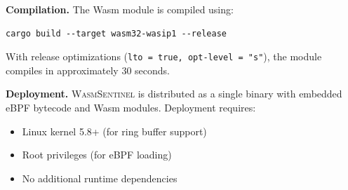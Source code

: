 \textbf{Compilation.}
The Wasm module is compiled using:
\begin{verbatim}
cargo build --target wasm32-wasip1 --release
\end{verbatim}

With release optimizations (\texttt{lto = true, opt-level = "s"}), the module compiles in approximately 30 seconds.

\textbf{Deployment.}
\textsc{WasmSentinel} is distributed as a single binary with embedded eBPF bytecode and Wasm modules.
Deployment requires:
\begin{itemize}
    \item Linux kernel 5.8+ (for ring buffer support)
    \item Root privileges (for eBPF loading)
    \item No additional runtime dependencies
\end{itemize}
